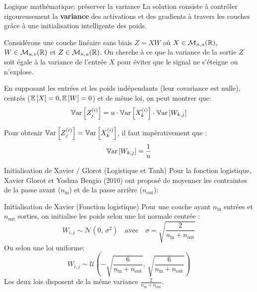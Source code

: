 \begin{frame}{Logique mathématique: préserver la variance}
	La solution consiste à contrôler rigoureusement la \textbf{variance} des activations et des gradients à travers les couches grâce à une initialisation intelligente des poids.
	
	\pause
	\vspace{0.2cm}
	
	Considérons une couche linéaire sans biais $Z = X W$ où $X \in \mathcal{M}_{n, u}(\mathbb{R})$, $W \in \mathcal{M}_{u, v}(\mathbb{R})$ et $Z \in \mathcal{M}_{n, u}(\mathbb{R})$. On cherche à ce que la variance de la sortie $Z$ soit égale à la variance de l'entrée $X$ pour éviter que le signal ne s'éteigne ou n'explose.
	
	\pause
	\vspace{0.2cm}
	
	En supposant les entrées et les poids indépendants (leur covariance est nulle), centrés ($\operatorname{\mathbb{E}}\left[X\right]=0, \operatorname{\mathbb{E}}\left[W\right]=0$) et de même loi, on peut montrer que:
	\begin{equation*}
		\operatorname{\mathbb{V}ar}\left[Z^{(i)}_j\right] = u \cdot \operatorname{\mathbb{V}ar}\left[X^{(i)}_k\right] \cdot \operatorname{\mathbb{V}ar}\left[W_{k,j}\right]
	\end{equation*}
		
	\pause
	\vspace{0.2cm}
	
	Pour obtenir $\operatorname{\mathbb{V}ar}\left[Z^{(i)}_j\right] = \operatorname{\mathbb{V}ar}\left[X^{(i)}_k\right]$, il faut impérativement que :
	\begin{equation*}
		\operatorname{\mathbb{V}ar}\left[W_{k,j}\right] = \frac{1}{u}
	\end{equation*}
\end{frame}

\begin{frame}{Initialisation de Xavier / Glorot (Logistique et Tanh)}
	Pour la fonction logistique, Xavier Glorot et Yoshua Bengio (2010) ont proposé de moyenner les contraintes de la passe avant ($n_{\text{in}}$) et de la passe arrière ($n_{\text{out}}$):
	
	\begin{block}{Initialisation de Xavier (Fonction logistique)}
		Pour une couche ayant $n_{\text{in}}$ entrées et $n_{\text{out}}$ sorties, on initialise les poids selon une loi normale centrée :
		\begin{equation*}
			W_{i,j} \sim \mathcal{N}\left(0, \, \sigma^2\right) \quad \text{avec} \quad \sigma = \sqrt{\frac{2}{n_{\text{in}} + n_{\text{out}}}}
		\end{equation*}
		Ou selon une loi uniforme:
		\begin{equation*}
			W_{i,j} \sim \mathcal{U}\left(-\sqrt{\frac{6}{n_{\text{in}} + n_{\text{out}}}}, \, \sqrt{\frac{6}{n_{\text{in}} + n_{\text{out}}}}\right)
		\end{equation*}
		Les deux lois disposent de la même variance $\frac{2}{n_{\text{in}} + n_{\text{out}}}$.
	\end{block}
\end{frame}

